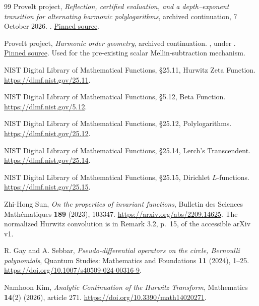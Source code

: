 \begin{thebibliography}{99}
ProveIt project,
\emph{Reflection, certified evaluation, and a depth--exponent
transition for alternating harmonic polylogarithms},
archived continuation, 7 October 2026.
.
\href{https://github.com/VladimirReshetnikov/ProveIt/blob/e0d9463bdee9685dfb1dddb819059cc738540c57/Analysis/Polylogarithms/docs/reports/alternating-harmonic-polylogarithms/article.tex}{Pinned source}.

ProveIt project,
\emph{Harmonic order geometry}, archived continuation.
,
under .
\href{https://github.com/VladimirReshetnikov/ProveIt/blob/e0d9463bdee9685dfb1dddb819059cc738540c57/Analysis/Polylogarithms/docs/reports/lerch-global-phase/continuations/harmonic-order-geometry/sections/harmonic_order.tex}{Pinned source}.
Used for the pre-existing scalar Mellin-subtraction mechanism.

NIST Digital Library of Mathematical Functions,
\S25.11, Hurwitz Zeta Function.
\url{https://dlmf.nist.gov/25.11}.

NIST Digital Library of Mathematical Functions,
\S5.12, Beta Function.
\url{https://dlmf.nist.gov/5.12}.

NIST Digital Library of Mathematical Functions,
\S25.12, Polylogarithms.
\url{https://dlmf.nist.gov/25.12}.

NIST Digital Library of Mathematical Functions,
\S25.14, Lerch's Transcendent.
\url{https://dlmf.nist.gov/25.14}.

NIST Digital Library of Mathematical Functions,
\S25.15, Dirichlet \(L\)-functions.
\url{https://dlmf.nist.gov/25.15}.

Zhi-Hong Sun,
\emph{On the properties of invariant functions},
Bulletin des Sciences Math\'ematiques \textbf{189} (2023), 103347.
\url{https://arxiv.org/abs/2209.14625}.
The normalized Hurwitz convolution is in Remark 3.2, p.~15,
of the accessible arXiv v1.

R. Gay and A. Sebbar,
\emph{Pseudo-differential operators on the circle, Bernoulli polynomials},
Quantum Studies: Mathematics and Foundations \textbf{11} (2024), 1--25.
\url{https://doi.org/10.1007/s40509-024-00316-9}.

Namhoon Kim,
\emph{Analytic Continuation of the Hurwitz Transform},
Mathematics \textbf{14}(2) (2026), article 271.
\url{https://doi.org/10.3390/math14020271}.


\end{thebibliography}
